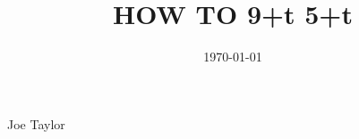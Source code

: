 \documentclass[12pt, dvipsnames, svgnames]{cmspaper} %
\renewcommand{\lstlistoflistings}{\listoflistings}
\begin{document}
\begin{titlepage}

   \date{\today}

  \title{HOW TO 9+t \Longrightarrow \bf{5+t}}

  \begin{Authlist}
    Joe Taylor
  \end{Authlist}

\end{titlepage}

\tableofcontents %

\newpage
{} %









\end{document}
